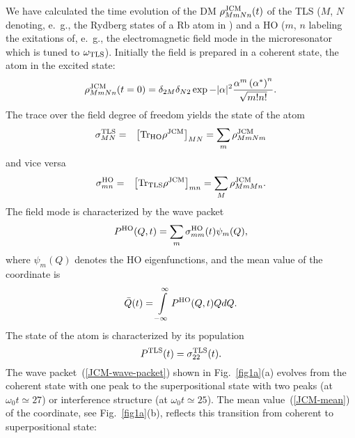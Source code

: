 \documentclass[12pt,twoside,a4paper]{report}
\begin{document}
We have calculated the time evolution of the DM
$\rho_{MmNn}^{\rm JCM}(t)$ of the TLS ($M$, $N$ denoting, e.~g.,
the Rydberg states of a Rb atom in \cite{brun96}) and a HO ($m$, $n$ labeling
the exitations of, e.~g., the electromagnetic field mode in the 
microresonator which is tuned to $\omega_{\rm TLS}$). Initially
the field is prepared in a coherent state, the atom in the excited state:
\begin{equation}
\label{JCM-initial}
\rho
_{MmNn}
^{\rm JCM}
 (t=0)
               =
                 \delta_{2M}   
                 \delta_{N2}   
                 \exp{-|\alpha|^2}   
                         \frac
                              {  \alpha^m \left( \alpha^* \right)^n  }
                              {  \sqrt{m!n!}     }.
\end{equation}
The trace over the field degree of freedom yields the state of the atom
\begin{eqnarray}
\sigma_{MN}^{\rm TLS}&=&\left[ {\rm Tr}_{\rm HO} \rho^{\rm JCM} \right]_{MN} 
                   =\sum\limits_m \rho_{MmNm}^{\rm JCM}
\label{JCM-atom}
\end{eqnarray}
and vice versa
\begin{eqnarray}
\sigma_{mn}^{\rm HO}&=&\left[ {\rm Tr}_{\rm TLS} \rho^{\rm JCM} \right]_{mn}
                 =\sum\limits_M \rho_{MmMn}^{\rm JCM}.
\label{JCM-field}
\end{eqnarray}
%
%
The field mode is characterized by the wave packet
\begin{equation}
\label{JCM-wave-packet}
P^{\rm HO}(Q,t)=
\sum\limits_m \sigma_{mm}^{\rm HO}(t)\psi_m(Q),
\end{equation}
where $\psi_m(Q)$ denotes the HO eigenfunctions, 
and the mean  value of the coordinate is
\begin{equation}
\bar Q(t) 
          = 
              \int \limits_{-\infty}^{\infty}
                 P^{\rm HO}(Q,t) Q dQ.
\label{JCM-mean}
\end{equation}
The state of the atom is characterized by its population
\begin{equation}
P^{\rm TLS}(t)=\sigma_{22}^{\rm TLS}(t).
\label{JCM-population}
\end{equation}
%
%
The wave packet~(\ref{JCM-wave-packet}) shown in
Fig.~\ref{fig1a}(a) evolves from the coherent state with one peak      
to the superpositional state with two peaks (at $\omega_0 t \simeq 27$)
or interference structure (at $\omega_0 t \simeq 25 $).
The mean value~(\ref{JCM-mean}) of the coordinate,  
see Fig.~\ref{fig1a}(b),
reflects this transition from coherent to superpositional state: 
\end{document}
